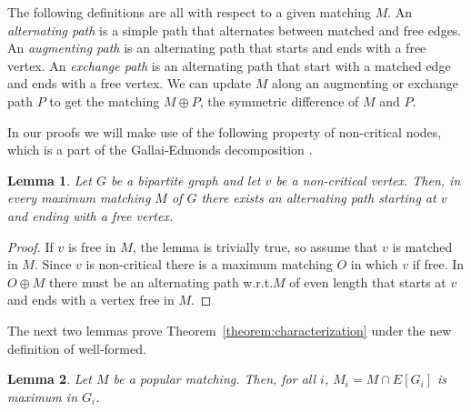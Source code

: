\documentclass[11pt]{article}
\newcommand{\wrt}{{w.r.t.}\xspace}
\newtheorem{lemma}{Lemma}
\begin{document}
The following definitions are all with respect to a given matching $M$. An \emph{alternating path} is a simple path that alternates between matched and free edges. An \emph{augmenting path} is an alternating path that starts and ends with a free vertex. An \emph{exchange path} is an alternating path that start with a matched edge and ends with a free vertex. We can update $M$ along an augmenting or exchange path $P$ to get the matching $M \oplus P$, the symmetric difference of $M$ and $P$. 

In our proofs we will make use of the following property of non-critical nodes, which is a part of the Gallai-Edmonds decomposition \cite{S03}.

\begin{lemma} \label{lemma:critical} Let $G$ be a bipartite graph and let $v$ be a non-critical vertex. Then, in every maximum matching $M$ of $G$ there exists an alternating path starting at $v$ and ending with a free vertex.
\end{lemma}

\begin{proof}
If $v$ is free in $M$, the lemma is trivially true, so assume that $v$ is matched in $M$.
Since $v$ is non-critical there is a maximum matching $O$ in which $v$ if free. In $O \oplus M$ there must be an alternating path \wrt $M$ of even length that starts at $v$ and ends with a vertex free in $M$.
\end{proof}

The next two lemmas prove Theorem~\ref{theorem:characterization} under the new definition of well-formed.

\begin{lemma} \label{lemma:first-ties} Let $M$ be a popular matching. Then, for all $i$, $M_i = M \cap E[G_i]$ is maximum in $G_i$.
\end{lemma}
\end{document}
